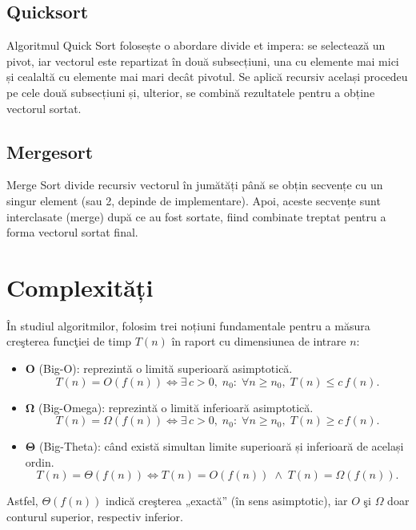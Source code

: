 \documentclass[11pt,a4paper]{article}
\theoremstyle{definition}
\theoremstyle{plain}
\theoremstyle{remark}
\begin{document}
\subsection{Quicksort}
Algoritmul Quick Sort folosește o abordare divide et impera: se selectează un pivot, iar vectorul este repartizat în două subsecțiuni, una cu elemente mai mici și cealaltă cu elemente mai mari decât pivotul. Se aplică recursiv același procedeu pe cele două subsecțiuni și, ulterior, se combină rezultatele pentru a obține vectorul sortat.\\

\subsection{Mergesort}
Merge Sort divide recursiv vectorul în jumătăți până se obțin secvențe cu un singur element (sau 2, depinde de implementare). Apoi, aceste secvențe sunt interclasate (merge) după ce au fost sortate, fiind combinate treptat pentru a forma vectorul sortat final.\\

\section{Complexități}

În studiul algoritmilor, folosim trei noțiuni fundamentale pentru a măsura creşterea funcţiei de timp \(T(n)\) în raport cu dimensiunea de intrare \(n\):

\begin{itemize}
  \item \(\mathbf{O}\) (Big-O): reprezintă o limită superioară asimptotică.
    \[
      T(n) = O(f(n)) \iff \exists\, c>0,\; n_0:\;\forall n\ge n_0,\; T(n)\le c\,f(n).
    \]
  \item \(\boldsymbol{\Omega}\) (Big-Omega): reprezintă o limită inferioară asimptotică.
    \[
      T(n) = \Omega(f(n)) \iff \exists\, c>0,\; n_0:\;\forall n\ge n_0,\; T(n)\ge c\,f(n).
    \]
  \item \(\boldsymbol{\Theta}\) (Big-Theta): când există simultan limite superioară și inferioară de același ordin.
    \[
      T(n) = \Theta(f(n)) \iff T(n) = O(f(n)) \;\wedge\; T(n) = \Omega(f(n)).
    \]
\end{itemize}

\noindent
Astfel, \(\Theta(f(n))\) indică creşterea „exactă” (în sens asimptotic), iar $O$ şi $\Omega$ doar conturul superior, respectiv inferior.

\end{document}
